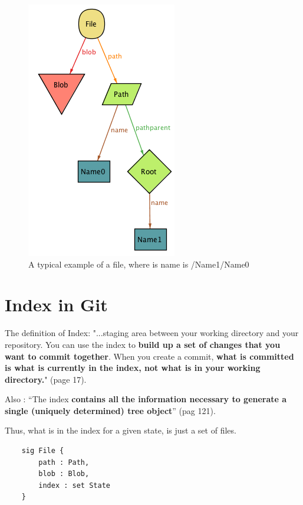 \begin{figure}[h!] 
	\caption{A typical example of a file, where is name is /Name1/Name0 }
	\centering
	\includegraphics[scale=0.65]{images/image1.png}
\end{figure}
\pagebreak


\section{Index in Git}

The definition of Index:
"...staging area between your working directory and your
repository. You can use the index to {\bf build up a set of 
changes that you want to commit together}. When you create
a commit, {\bf what is committed is what is currently in the
index, not what is in your working directory.}"
\cite{gitComm} (page 17). \par

Also : ``The index {\bf contains all the information necessary to generate a single
(uniquely determined) tree object}'' \cite{gitComm} (pag 121). \par

Thus, what is in the index for a given state, is just a set of files.

\begin{lstlisting}
	sig File {
		path : Path,
		blob : Blob,
		index : set State
	}

\end{lstlisting}

